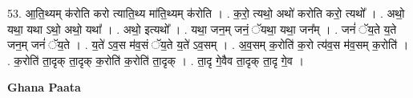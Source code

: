 \documentclass[17pt]{extarticle}
\begin{document}
53. आ॒ति॒थ्यम् क॑रोति करो त्याति॒थ्य मा॑ति॒थ्यम् क॑रोति । . क॒रो॒ त्यथो॒ अथो॑ करोति करो॒ त्यथो᳚ । . अथो॒ यथा॒ यथा ऽथो॒ अथो॒ यथा᳚ । . अथो॒ इत्यथो᳚ । . यथा॒ जन॒म् जनं॒ ॅयथा॒ यथा॒ जन᳚म् । . जनं॑ ॅय॒ते य॒ते जन॒म् जनं॑ ॅय॒ते । . य॒ते॑ ऽव॒स म॑व॒सं ॅय॒ते य॒ते॑ ऽव॒सम् । . अ॒व॒सम् क॒रोति॑ क॒रो त्य॑व॒स म॑व॒सम् क॒रोति॑ । . क॒रोति॑ ता॒दृक् ता॒दृक् क॒रोति॑ क॒रोति॑ ता॒दृक् । . ता॒दृ गे॒वैव ता॒दृक् ता॒दृ गे॒व । \newline

\textbf{Ghana Paata } \newline
\end{document}
